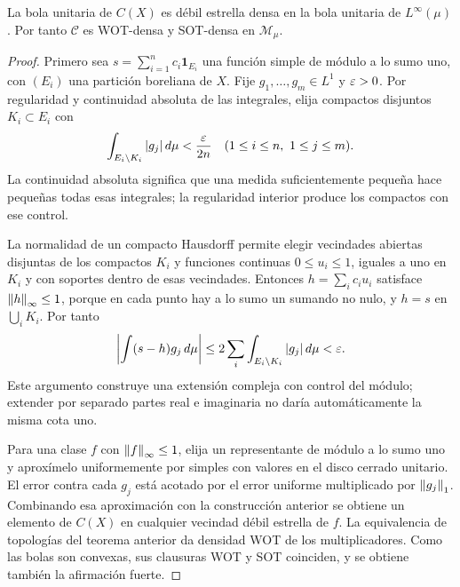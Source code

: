 \begin{teorema}\label{v3:continua-densa-linfty}
La bola unitaria de $C(X)$ es débil estrella densa en la bola unitaria de $L^\infty(\mu)$. Por tanto $\mathcal C$ es WOT-densa y SOT-densa en $\mathcal M_\mu$.
\end{teorema}
\begin{proof}
Primero sea $s=\sum_{i=1}^nc_i\mathbf1_{E_i}$ una función simple de módulo a lo sumo uno, con $(E_i)$ una partición boreliana de $X$. Fije $g_1,\ldots,g_m\in L^1$ y $\varepsilon>0$. Por regularidad y continuidad absoluta de las integrales, elija compactos disjuntos $K_i\subset E_i$ con
\[
 \int_{E_i\setminus K_i}|g_j|\,d\mu<\frac{\varepsilon}{2n}
 \quad(1\le i\le n,\ 1\le j\le m).
\]
La continuidad absoluta significa que una medida suficientemente pequeña hace pequeñas todas esas integrales; la regularidad interior produce los compactos con ese control.

La normalidad de un compacto Hausdorff permite elegir vecindades abiertas disjuntas de los compactos $K_i$ y funciones continuas $0\le u_i\le1$, iguales a uno en $K_i$ y con soportes dentro de esas vecindades. Entonces $h=\sum_i c_i u_i$ satisface $\left\lVert h\right\rVert_\infty\le1$, porque en cada punto hay a lo sumo un sumando no nulo, y $h=s$ en $\bigcup_iK_i$. Por tanto
\[
 \left|\int(s-h)g_j\,d\mu\right|
 \le2\sum_i\int_{E_i\setminus K_i}|g_j|\,d\mu<\varepsilon.
\]
Este argumento construye una extensión compleja con control del módulo; extender por separado partes real e imaginaria no daría automáticamente la misma cota uno.

Para una clase $f$ con $\left\lVert f\right\rVert_\infty\le1$, elija un representante de módulo a lo sumo uno y aproxímelo uniformemente por simples con valores en el disco cerrado unitario. El error contra cada $g_j$ está acotado por el error uniforme multiplicado por $\left\lVert g_j\right\rVert_1$. Combinando esa aproximación con la construcción anterior se obtiene un elemento de $C(X)$ en cualquier vecindad débil estrella de $f$. La equivalencia de topologías del teorema anterior da densidad WOT de los multiplicadores. Como las bolas son convexas, sus clausuras WOT y SOT coinciden, y se obtiene también la afirmación fuerte.
\end{proof}

